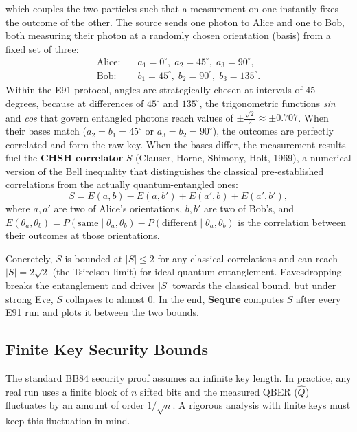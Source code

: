 \documentclass[12pt, a4paper]{article}
\begin{document}
which couples the two particles such that a measurement on one instantly fixes the outcome of the other. The source sends one photon to Alice and one to Bob, both measuring their photon at a randomly chosen orientation (basis) from a fixed set of three: 
\begin{align*}
  \text{Alice:} &\quad a_1 = 0^\circ,\; a_2 = 45^\circ,\; a_3 = 90^\circ, \\
  \text{Bob:}   &\quad b_1 = 45^\circ,\; b_2 = 90^\circ,\; b_3 = 135^\circ.
  \label{eq:e91-angles}
\end{align*}
Within the E91 protocol, angles are strategically chosen at intervals of 45 degrees, because at differences of $45^\circ$ and $135^\circ$, the trigonometric functions \textit{sin} and \textit{cos} that govern entangled photons reach values of $\pm\frac{\sqrt{2}}{2} \approx \pm0.707$. When their bases match ($a_2 = b_1 = 45^\circ$ or $a_3 = b_2 = 90^\circ$), the outcomes are perfectly correlated and form the raw key. When the bases differ, the measurement results fuel the \textbf{CHSH correlator} $S$ (Clauser, Horne, Shimony, Holt, 1969), a numerical version of the Bell inequality that distinguishes the classical pre-established correlations from the actually quantum-entangled ones:
\begin{equation*}
  S = E(a, b) - E(a, b') + E(a', b) + E(a', b'),
  \label{eq:chsh}
\end{equation*}
where $a, a'$ are two of Alice's orientations, $b, b'$ are two of
Bob's, and
$E(\theta_a, \theta_b) = P(\text{same} \mid \theta_a, \theta_b)
- P(\text{different} \mid \theta_a, \theta_b)$
is the correlation between their outcomes at those orientations.

Concretely, $S$ is bounded at $|S| \leq 2$ for any classical correlations and can reach $|S| = 2\sqrt{2}$ (the Tsirelson limit) for ideal quantum-entanglement. Eavesdropping breaks the entanglement and drives $|S|$ towards the classical bound, but under strong Eve, $S$ collapses to almost 0. In the end, \textbf{Sequre} computes $S$ after every E91 run and plots it between the two bounds.

\subsection{Finite Key Security Bounds}
\label{sec:finite-key-theory}

The standard BB84 security proof assumes an infinite key length. In practice, any real run uses a finite block of $n$ sifted bits and the measured QBER ($\hat{Q}$) fluctuates by an amount of order $1/\sqrt{n}$. A rigorous analysis with finite keys must keep this fluctuation in mind. 
\end{document}
